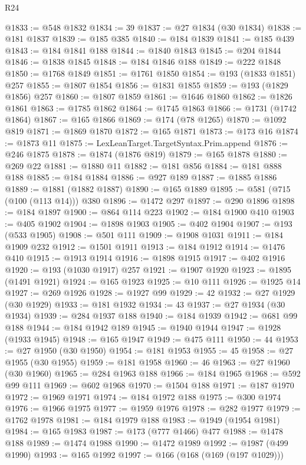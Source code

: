 \begin{lexlean}{R24}
\begin{coremodule}
@1833 := @548 @1832
@1834 := 39
@1837 := @27 @1834 (@30 @1834)
@1838 := @181 @1837
@1839 := @185 @385
@1840 := @184 @1839
@1841 := @185 @439
@1843 := @184 @1841 @188
@1844 := @1840 @1843
@1845 := @204 @1844
@1846 := @1838 @1845
@1848 := @184 @1846 @188
@1849 := @222 @1848
@1850 := @1768 @1849
@1851 := @1761 @1850
@1854 := @193 (@1833 @1851) @257
@1855 := @1807 @1854
@1856 := @1831 @1855
@1859 := @193 (@1829 @1856) @257
@1860 := @1807 @1859
@1861 := @1646 @1860
@1862 := @1826 @1861
@1863 := @1785 @1862
@1864 := @1745 @1863
@1866 := @1731 (@1742 @1864)
@1867 := @165 @1866
@1869 := @174 (@78 @1265)
@1870 := @1092 @819
@1871 := @1869 @1870
@1872 := @165 @1871
@1873 := @173 @16
@1874 := @1873 @11
@1875 := LexLeanTarget.TargetSyntax.Prim.append
@1876 := @246 @1875
@1878 := @1874 (@1876 @819)
@1879 := @165 @1878
@1880 := @269 @22
@1881 := @1880 @11
@1882 := @181 @856
@1884 := @181 @888 @188
@1885 := @184 @1884
@1886 := @927 @189
@1887 := @1885 @1886
@1889 := @1881 (@1882 @1887)
@1890 := @165 @1889
@1895 := @581 (@715 (@100 (@113 @14))) @380
@1896 := @1472 @297
@1897 := @290 @1896
@1898 := @184 @1897
@1900 := @864 @114 @223
@1902 := @184 @1900 @410
@1903 := @405 @1902
@1904 := @1898 @1903
@1905 := @402 @1904
@1907 := @193 (@533 @1905)
@1908 := @501 @111
@1909 := @1908 @1031
@1911 := @184 @1909 @232
@1912 := @1501 @1911
@1913 := @184 @1912
@1914 := @1476 @410
@1915 := @1913 @1914
@1916 := @1898 @1915
@1917 := @402 @1916
@1920 := @193 (@1030 @1917) @257
@1921 := @1907 @1920
@1923 := @1895 (@1491 @1921)
@1924 := @165 @1923
@1925 := @10 @111
@1926 := @1925 @14
@1927 := @269 @1926
@1928 := @1927 @99
@1929 := 42
@1932 := @27 @1929 (@30 @1929)
@1933 := @181 @1932
@1934 := 43
@1937 := @27 @1934 (@30 @1934)
@1939 := @284 @1937 @188
@1940 := @184 @1939
@1942 := @681 @99 @188
@1944 := @184 @1942 @189
@1945 := @1940 @1944
@1947 := @1928 (@1933 @1945)
@1948 := @165 @1947
@1949 := @475 @111
@1950 := 44
@1953 := @27 @1950 (@30 @1950)
@1954 := @181 @1953
@1955 := 45
@1958 := @27 @1955 (@30 @1955)
@1959 := @181 @1958
@1960 := 46
@1963 := @27 @1960 (@30 @1960)
@1965 := @284 @1963 @188
@1966 := @184 @1965
@1968 := @592 @99 @111
@1969 := @602 @1968
@1970 := @1504 @188
@1971 := @187 @1970
@1972 := @1969 @1971
@1974 := @184 @1972 @188
@1975 := @300 @1974
@1976 := @1966 @1975
@1977 := @1959 @1976
@1978 := @282 @1977
@1979 := @1762 @1978
@1981 := @184 @1979 @188
@1983 := @1949 (@1954 @1981)
@1984 := @165 @1983
@1987 := @173 (@777 @1466) @477
@1988 := @1478 @188
@1989 := @1474 @1988
@1990 := @1472 @1989
@1992 := @1987 (@499 @1990)
@1993 := @165 @1992
@1997 := @166 (@168 (@169 (@197 @1029)))

\end{coremodule}
\end{lexlean}
